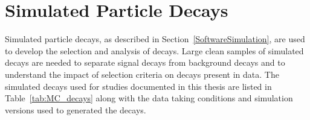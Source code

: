 \section{Simulated Particle Decays}
\label{sec:MCsamples}
Simulated particle decays, as described in Section~\ref{SoftwareSimulation}, are used to develop the selection and analysis of \bsmumu decays. Large clean samples of simulated decays are needed to separate signal decays from background decays and to understand the impact of selection criteria on decays present in data. 
The simulated decays used for studies documented in this thesis are listed in Table~\ref{tab:MC_decays} along with the data taking conditions and simulation versions used to generated the decays.
